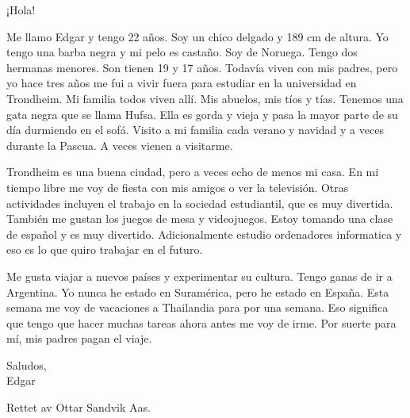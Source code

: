 \documentclass[a4paper]{article}
\date{}
\begin{document}
\thispagestyle{fancy}

¡Hola!                                                                                                  

Me llamo Edgar y tengo 22 años. Soy un chico delgado y 189 cm de altura. Yo tengo una barba negra y mi pelo es castaño. Soy de Noruega. Tengo dos hermanas menores. Son tienen 19 y 17 años. Todavía viven con mis padres, pero yo hace tres años me fui a vivir fuera para estudiar en la universidad en Trondheim. Mi familia todos viven allí. Mis abuelos, mis tíos y tías. Tenemos una gata negra que se llama Hufsa. Ella es gorda y vieja y pasa la mayor parte de su día durmiendo en el sofá. Visito a mi familia cada verano y navidad y a veces durante la Pascua. A veces vienen a visitarme.

Trondheim es una buena ciudad, pero a veces echo de menos mi casa. En mi tiempo libre me voy de fiesta con mis amigos o ver la televisión. Otras actividades incluyen el trabajo en la sociedad estudiantil, que es muy divertida. También me gustan los juegos de mesa y videojuegos. Estoy tomando una clase de español y es muy divertido. Adicionalmente estudio ordenadores informatica y eso es lo que quiro trabajar en el futuro. 

Me gusta viajar a nuevos países y experimentar su cultura. Tengo ganas de ir a Argentina. Yo nunca he estado en Suramérica, pero he estado en España. Esta semana me voy de vacaciones a Thailandia para por una semana. Eso significa que tengo que hacer muchas tareas ahora antes me voy de irme. Por suerte para mí, mis padres pagan el viaje. 

Saludos,\\
Edgar

\par

Rettet av Ottar Sandvik Aas.
\end{document}
